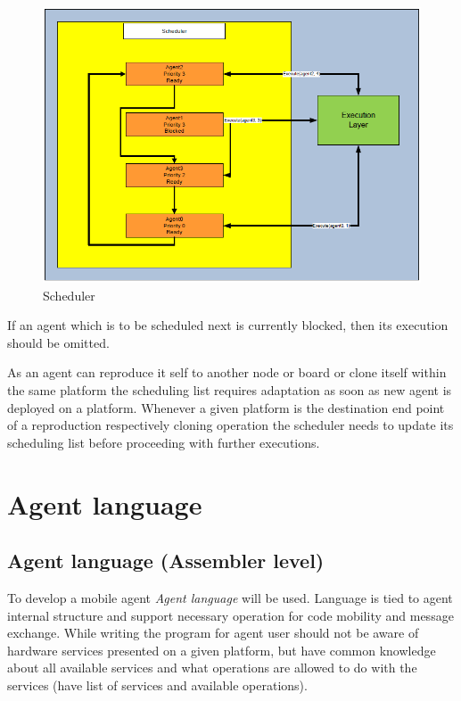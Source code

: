 \documentclass{scrreprt}
\begin{document}
\begin{figure}[!htbp]
\begin{center}
\includegraphics[scale=0.4]{figures/scheduler.png}
\caption{Scheduler}
\end{center}
\label{scheduler}
\end{figure}


\noindent
If an agent which is to be scheduled next is currently blocked, then its execution should be omitted. 


\noindent
As an agent can reproduce it self to another node or board or clone itself within the same platform the scheduling 
list requires adaptation as soon as new agent is deployed on a platform. Whenever a given platform is the destination 
end point of a reproduction respectively cloning operation the scheduler needs to update its scheduling list before proceeding with further executions.
\section{Agent language}

\subsection{Agent language (Assembler level)}
To develop a mobile agent \textit{Agent language} will be used.
Language is tied to agent internal structure and support necessary operation for code mobility and message exchange.
While writing the program for agent user should not be aware of hardware services presented on a given platform, 
but have common knowledge about all available services and what operations are allowed to do with the services
(have list of services and available operations).
\end{document}
